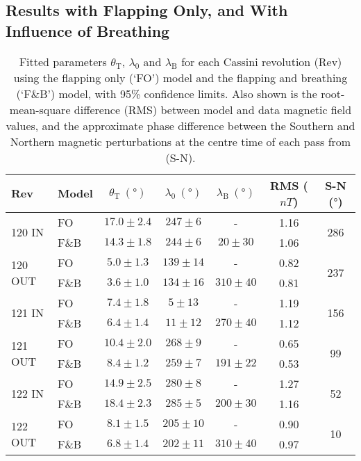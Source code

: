 \subsection{Results with Flapping Only, and With Influence of Breathing}
\begin{table}
\caption[Fitted parameters for FO and F{\&}B models, for \textit{Cassini} Revs 120-122.]{Fitted parameters $\theta_\mathrm{T}$, $\lambda_0$ and $\lambda_\mathrm{B}$ for each Cassini revolution (Rev) using the flapping only (`FO') model and the flapping and breathing (`F{\&}B') model, with 95\% confidence limits. Also shown is the root-mean-square difference (RMS) between model and data magnetic field values, and the approximate phase difference between the Southern and Northern magnetic perturbations at the centre time of each pass from \citet{andrews2012} (S-N). }\label{equinox:table:fitparams}
\centering
\begin{tabular}{l l c c c c | c}
\hline
 Rev & Model & $\theta_\mathrm{T}~(\si\degree)$& $\lambda_0~(\si\degree)$ & $\lambda_\mathrm{B}~(\si\degree)$ & RMS ($\si{nT}$) & S-N ($\si{\degree}$) \\
\hline
\multirow{2}{*}{120 IN} 		& FO 		& $17.0\pm2.4$ 	& $247\pm6$ 	& -						& 1.16 	&	\multirow{2}{*}{286}\\
 											& F{\&}B 	& $14.3\pm1.8$ 	& $244\pm6$ 	& $20\pm30$ 	& 1.06	&\\ 
\multirow{2}{*}{120 OUT}	& FO 		& $5.0\pm1.3$ 		& $139\pm14$ 	& - 						& 0.82	& \multirow{2}{*}{237}\\
 											& F{\&}B 	& $3.6\pm1.0$ 		& $134\pm16$ 	& $310\pm40$ 	& 0.81 &\\ 
\multirow{2}{*}{121 IN} 		& FO 		& $7.4\pm1.8$ 		& $5\pm13$ 		& - 						& 1.19 & \multirow{2}{*}{156} \\
 											& F{\&}B 	& $6.4\pm1.4$ 		& $11\pm12$ 	& $270\pm40$	& 1.12 & \\ 
\multirow{2}{*}{121 OUT}	& FO 		& $10.4\pm2.0$ 	& $268\pm9$ 	& -						& 0.65 & \multirow{2}{*}{99}\\
											& F{\&}B 	& $8.4\pm1.2$ 		& $259\pm7$ 	& $191\pm22$ 	& 0.53 & \\ 
\multirow{2}{*}{122 IN}		& FO 		& $14.9\pm2.5$ 	& $280\pm8$	& -						& 1.27 & \multirow{2}{*}{52} \\
											& F{\&}B 	& $18.4\pm2.3$ 	& $285\pm5$ 	& $200\pm30$ &	1.16 &\\ 
\multirow{2}{*}{122 OUT}	& FO 		& $8.1\pm1.5$ 		& $205\pm10$ & -					& 0.90	& \multirow{2}{*}{10}\\
											& F{\&}B 	& $6.8\pm1.4$ 	& $202\pm11$ 	& $310\pm40$		&	0.97 &\\
\hline
\end{tabular}
\end{table}
